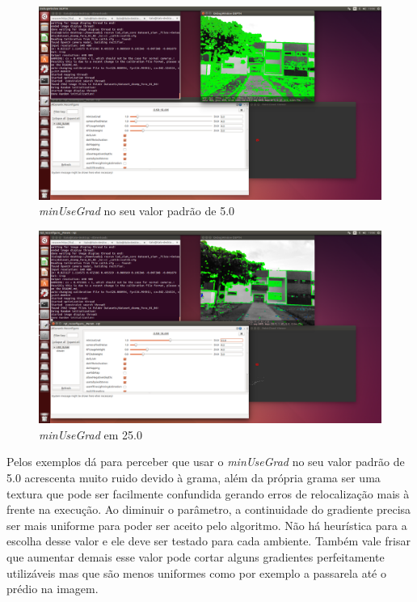 \begin{figure}[!htb]
	\centering
		\includegraphics[width= \textwidth]{Imagens/figura3-31.png}
	\caption{\textit{minUseGrad} no seu valor padrão de 5.0}
	\label{fig3:29}
\end{figure}

\begin{figure}[!htb]
	\centering
		\includegraphics[width= \textwidth]{Imagens/figura3-32.png}
	\caption{\textit{minUseGrad} em 25.0}
	\label{fig3:30}
\end{figure}

Pelos exemplos dá para perceber que usar o \textit{minUseGrad} no seu valor padrão de 5.0 acrescenta muito ruido devido à grama, além da própria grama ser uma textura que pode ser facilmente confundida gerando erros de relocalização mais à frente na execução. Ao diminuir o parâmetro, a continuidade do gradiente precisa ser mais uniforme para poder ser aceito pelo algoritmo. Não há heurística para a escolha desse valor e ele deve ser testado para cada ambiente. Também vale frisar que aumentar demais esse valor pode cortar alguns gradientes perfeitamente utilizáveis mas que são menos uniformes como por exemplo a passarela até o prédio na imagem.

